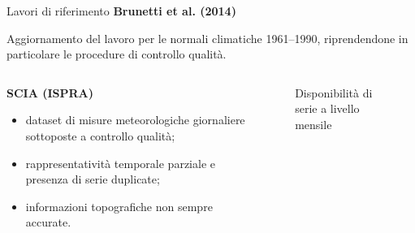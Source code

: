\begin{frame}[t]{Lavori di riferimento}
  \textbf{Brunetti et al. (2014)}

  Aggiornamento del lavoro per le normali climatiche 1961--1990, riprendendone in particolare le procedure di controllo qualità.

  \begin{columns}
    \begin{column}{0.55\textwidth}
      \textbf{SCIA (ISPRA)}
      \begin{itemize}
        \item dataset di misure meteorologiche giornaliere sottoposte a controllo qualità;
        \item rappresentatività temporale parziale e presenza di serie duplicate;
        \item informazioni topografiche non sempre accurate.
      \end{itemize}
    \end{column}
    \begin{column}{0.45\textwidth}
      \begin{figure}
        
        \caption*{\small Disponibilità di serie a livello mensile}
      \end{figure}
    \end{column}
  \end{columns}

\end{frame}